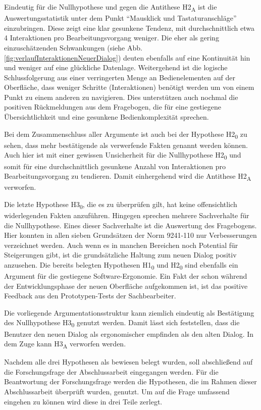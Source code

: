 Eindeutig für die Nullhypothese und gegen die Antithese H2\textsubscript{A} ist die Auswertungsstatistik unter dem Punkt \enquote{Mausklick und Tastaturanschläge} einzubringen. Diese zeigt eine klar gesunkene Tendenz, mit durchschnittlich etwa 4 Interaktionen pro Bearbeitungsvorgang weniger. Die eher als gering einzuschätzenden Schwankungen (siehe Abb. \ref{fig:verlaufInteraktionenNeuerDialog}) deuten ebenfalls auf eine Kontinuität hin und weniger auf eine glückliche Datenlage. Weitergehend ist die logische Schlussfolgerung aus einer verringerten Menge an Bedienelementen auf der Oberfläche, dass weniger Schritte (Interaktionen) benötigt werden um von einem Punkt zu einem anderen zu navigieren. Dies unterstützen auch nochmal die positiven Rückmeldungen aus dem Fragebogen, die für eine gestiegene Übersichtlichkeit und eine gesunkene Bedienkomplexität sprechen.

Bei dem Zusammenschluss aller Argumente ist auch bei der Hypothese H2\textsubscript{0} zu sehen, dass mehr bestätigende als verwerfende Fakten genannt werden können. Auch hier ist mit einer gewissen Unsicherheit für die Nullhypothese H2\textsubscript{0} und somit für eine durchschnittlich gesunkene Anzahl von Interaktionen pro Bearbeitungsvorgang zu tendieren. Damit einhergehend wird die Antithese H2\textsubscript{A} verworfen.

Die letzte Hypothese H3\textsubscript{0}, die es zu überprüfen gilt, hat keine offensichtlich widerlegenden Fakten anzuführen. Hingegen sprechen mehrere Sachverhalte für die Nullhypothese. Eines dieser Sachverhalte ist die Auswertung des Fragebogens. Hier konnten in allen sieben Grundsätzen der Norm 9241-110 nur Verbesserungen verzeichnet werden. Auch wenn es in manchen Bereichen noch Potential für Steigerungen gibt, ist die grundsätzliche Haltung zum neuen Dialog positiv anzusehen. Die bereits belegten Hypothesen H1\textsubscript{0} und H2\textsubscript{0} sind ebenfalls ein Argument für die gestiegene Software-Ergonomie. Ein Fakt der schon während der Entwicklungsphase der neuen Oberfläche aufgekommen ist, ist das positive Feedback aus den Prototypen-Tests der Sachbearbeiter.

Die vorliegende Argumentationsstruktur kann ziemlich eindeutig als Bestätigung des Nullhypothese H3\textsubscript{0} genutzt werden. Damit lässt sich feststellen, dass die Benutzer den neuen Dialog als ergonomischer empfinden als den alten Dialog. In dem Zuge kann H3\textsubscript{A} verworfen werden.

Nachdem alle drei Hypothesen als bewiesen belegt wurden, soll abschließend auf die Forschungsfrage der Abschlussarbeit eingegangen werden. Für die Beantwortung der Forschungsfrage werden die Hypothesen, die im Rahmen dieser Abschlussarbeit überprüft wurden, genutzt. Um auf die Frage umfassend eingehen zu können wird diese in drei Teile zerlegt. 

